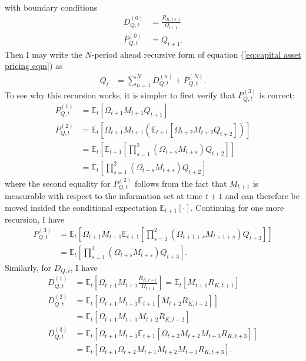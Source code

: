 \documentclass[12 pt, oneside]{article}
\theoremstyle{definition}
\theoremstyle{definition}
\theoremstyle{definition}
\newcommand{\E}{\mathbb{E}}
\begin{document}
with boundary conditions
\begin{align*}
  D_{Q, t}^{(0)} & = \frac{R_{K, t + 1}}{\Omega_{t + 1}}\\
  P_{Q, t}^{(0)} & = Q_{t + 1}.
\end{align*}
Then I may write the $N$-period ahead recursive form of equation (\ref{eq:capital asset pricing eqm}) as
\begin{align*}
  Q_t & = \sum_{n = 1}^ND_{Q, t}^{(n)} + P_{Q, t}^{(N)}.
\end{align*}
To see why this recursion works, it is simpler to first verify that $P_{Q, t}^{(3)}$ is correct:
\begin{align*}
  P_{Q, t}^{(1)} & = \E_t\left[\Omega_{t + 1}M_{t + 1} Q_{t + 1}\right]\\
  P_{Q, t}^{(2)} & = \E_t\left[\Omega_{t + 1}M_{t + 1} (\E_{t + 1}[\Omega_{t + 2}M_{t + 2} Q_{t + 2}])\right]\\
                 & = \E_t\left[\E_{t + 1}\left[\prod_{s = 1}^2(\Omega_{t + s}M_{t + s}) Q_{t + 2}\right]\right]\\
                 & = \E_t\left[\prod_{s = 1}^2(\Omega_{t + s}M_{t + s}) Q_{t + 2}\right].
\end{align*}
where the second equality for $P_{Q, t}^{(2)}$ follows from the fact that $M_{t + 1}$ is measurable with respect to the information set at time $t + 1$ and can
therefore be moved insided the conditional expectation $\E_{t + 1}[\cdot]$. Continuing for one more recursion, I have
\begin{align*}
  P_{Q, t}^{(3)} & = \E_t\left[\Omega_{t + 1}M_{t + 1}\E_{t + 1}\left[\prod_{s = 1}^2(\Omega_{t + 1 + s}M_{t + 1 + s}) Q_{t + 3}\right]\right]\\
                 & = \E_t\left[\prod_{s = 1}^3(\Omega_{t + s}M_{t + s}) Q_{t + 3}\right].
\end{align*}
Similarly, for $D_{Q, t}$, I have
\begin{align*}
  D_{Q, t}^{(1)} & = \E_t\left[\Omega_{t + 1}M_{t + 1}\frac{R_{K, t + 1}}{\Omega_{t + 1}}\right] = \E_t[M_{t + 1} R_{K, t + 1}]\\
  D_{Q, t}^{(2)} & = \E_t[\Omega_{t + 1}M_{t + 1}\E_{t + 1}[M_{t + 2}R_{K, t + 2}]]\\
                 & = \E_t[\Omega_{t + 1}M_{t + 1}M_{t + 2}R_{K, t + 2}]\\
  D_{Q, t}^{(3)} & = \E_t[\Omega_{t + 1}M_{t + 1}\E_{t + 1}[\Omega_{t + 2}M_{t + 2}M_{t + 3}R_{K, t + 3}]]\\
                 & = \E_t[\Omega_{t + 1}\Omega_{t + 2}M_{t + 1}M_{t + 2}M_{t + 3}R_{K, t + 3}].
\end{align*}
\end{document}
